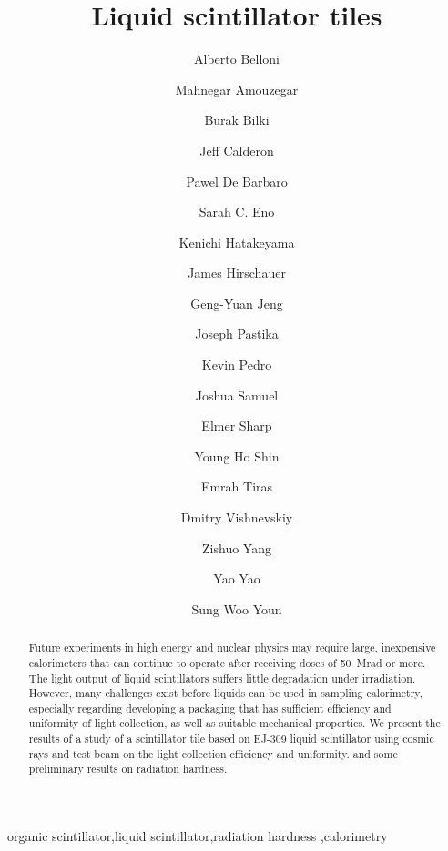 \documentclass[review]{elsarticle}
\begin{document}
\begin{frontmatter}

\title{Liquid scintillator tiles }


\author[umd]{Alberto Belloni}
\author[umd]{Mahnegar Amouzegar}
\author[iowa]{Burak Bilki}
\author[umd]{Jeff Calderon}
\author[rochester]{Pawel De Barbaro}
\author[umd]{Sarah C. Eno}
\author[baylor]{Kenichi Hatakeyama}
\author[fnal]{James Hirschauer}
\author[umd]{Geng-Yuan Jeng}
\author[baylor]{Joseph Pastika}
\author[fnal]{Kevin Pedro}
\author[umd]{Joshua Samuel}
\author[elmer]{Elmer Sharp}
\author[umd]{Young Ho Shin}
\author[baylor]{Emrah Tiras}
\author[rochester]{Dmitry Vishnevskiy}
\author[umd]{Zishuo Yang}
\author[umd]{Yao Yao}
\author[korea]{Sung Woo Youn}




\address[umd]{Dept. Physics, U. Maryland, College Park MD 30742 USA}
\address[korea]{Institute for Basic Science, Center for Axion and Precision Physics Research, IBS Center for Axion and Precision Physics Research
Room 4315, Department of Physics, Natural Science Building (E6-2), KAIST,
291 Daehak-ro, Yuseong-gu, Daejeon 305-701, South Korea}
\address[elmer]{Elmer Sharp Engineering, 7007 Leesville Blvd. Springfield, VA 22151}
\address[fnal]{Fermi National Accelerator Laboratory, Batavia, IL, USA}
\address[baylor]{Baylor University, Waco, Texas, USA}
\address[iowa]{The University of Iowa, Iowa City, IA, USA}
\address[rochester]{The University of Rochester, Rochester, NY, USA}

\begin{abstract}
Future experiments in high energy and nuclear physics may require
large, inexpensive calorimeters that can continue to
operate after receiving doses of 50~Mrad
or more. The light output of liquid scintillators suffers little
degradation under irradiation.  However, many challenges exist
before  liquids can be used in sampling calorimetry,
especially regarding developing
a packaging that has sufficient efficiency and uniformity of light collection,
as well as
suitable mechanical properties.
We present the results of a study of a scintillator tile
based on EJ-309 liquid scintillator using cosmic rays and test beam
on the light collection efficiency and uniformity. and some preliminary results
on radiation hardness.
\end{abstract}

\begin{keyword}
organic scintillator\sep liquid scintillator\sep radiation
hardness \sep calorimetry
\end{keyword}

\end{frontmatter}
\end{document}
